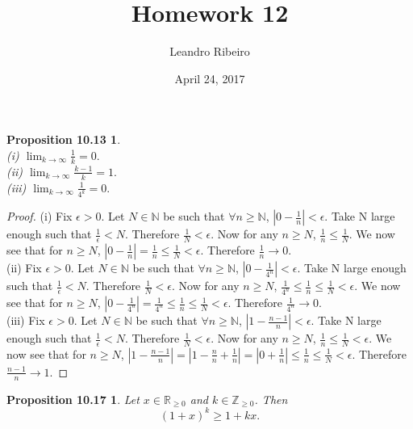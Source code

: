 \documentclass[12pt]{amsart}
\newcommand{\N}{\mathbb{N}}
\newcommand{\R}{\mathbb{R}}
\newcommand{\Z}{\mathbb{Z}}
\begin{document}
\title{Homework 12}
\date{April 24, 2017}
\author{Leandro Ribeiro}

\maketitle

\newtheorem*{prop10.13}{Proposition 10.13}

\begin{prop10.13}~\\
	\emph{(i)} $\displaystyle{\lim_{k \to \infty}} \frac{1}{k} = 0.$
	\\\emph{(ii)} $\displaystyle{\lim_{k \to \infty}} \frac{k - 1}{k} = 1.$
	\\\emph{(iii)} $\displaystyle{\lim_{k \to \infty}} \frac{1}{4^k} = 0.$

\end{prop10.13}
\begin{proof}
	(i) Fix $\epsilon > 0 $. Let $N \in \N$ be such that $\forall n \geq \N$, $|0 - \frac{1}{n}| < \epsilon$. Take N large enough such that $ \frac{1}{\epsilon} < N$. Therefore $\frac{1}{N} < \epsilon$. Now for any $n \geq N$, $\frac{1}{n} \leq \frac{1}{N}$. We now see that for $n \geq N$, $| 0 - \frac{1}{n}| = \frac{1}{n} \leq \frac{1}{N} < \epsilon$. Therefore $\frac{1}{n} \rightarrow 0$.
	\\\indent(ii) Fix $\epsilon > 0 $. Let $N \in \N$ be such that $\forall n \geq \N$, $|0 - \frac{1}{4^n}| < \epsilon$. Take N large enough such that $ \frac{1}{\epsilon} < N$. Therefore $\frac{1}{N} < \epsilon$. Now for any $n \geq N$, $\frac{1}{4^n} \leq \frac{1}{n} \leq \frac{1}{N} < \epsilon$. We now see that for $n \geq N$, $| 0 - \frac{1}{4^n}| = \frac{1}{4^n} \leq \frac{1}{n} \leq \frac{1}{N} < \epsilon$. Therefore $\frac{1}{4^n} \rightarrow 0$.
	\\\indent(iii) Fix $\epsilon > 0 $. Let $N \in \N$ be such that $\forall n \geq \N$, $|1 - \frac{n-1}{n}| < \epsilon$. Take N large enough such that $ \frac{1}{\epsilon} < N$. Therefore $\frac{1}{N} < \epsilon$. Now for any $n \geq N$, $\frac{1}{n} \leq \frac{1}{N} < \epsilon$. We now see that for $n \geq N$, $| 1 - \frac{n-1}{n}| = | 1 - \frac{n}{n} + \frac{1}{n}| = | 0 + \frac{1}{n}| \leq \frac{1}{n} \leq \frac{1}{N} < \epsilon$. Therefore $\frac{n-1}{n} \rightarrow 1$.

\end{proof}

\newtheorem*{prop10.17}{Proposition 10.17}
\begin{prop10.17}
	Let $x \in \R_{\geq0}$ and $k \in \Z_{\geq0}$. Then $$(1 + x)^k \geq 1 + kx.$$
\end{prop10.17}
\end{document}

